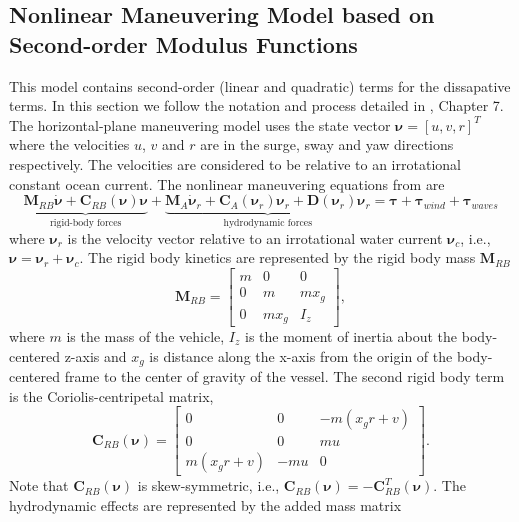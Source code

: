 \documentclass[11pt,draftcls,journal,onecolumn]{IEEEtran}
\begin{document}
\subsection{Nonlinear Maneuvering Model based on Second-order Modulus Functions}
This model contains second-order (linear and quadratic) terms for the dissapative terms. In this section we follow the notation and process detailed in \cite{fossen11handbook}, Chapter 7. The horizontal-plane maneuvering model uses the state vector $\bm{\nu}=[u,v,r]^T$ where the velocities $u$, $v$ and $r$ are in the surge, sway and yaw directions respectively.  The velocities are considered to be relative to an irrotational constant ocean current.  The nonlinear maneuvering equations from \cite{fossen11handbook} are
\begin{equation}
\underbrace{\bm{M}_{RB}\dot{\bm{\nu}}+\bm{C}_{RB}(\bm{\nu})\bm{\nu}}_\text{rigid-body forces} +
\underbrace{\bm{M}_A\dot{\bm{\nu}}_r + \bm{C}_A(\bm{\nu}_r)\bm{\nu}_r + 
\bm{D}(\bm{\nu}_r)\bm{\nu}_r}_\text{hydrodynamic forces}
= \bm{\tau}+\bm{\tau}_{wind}+\bm{\tau}_{waves}
\label{e:fossenmodel}
\end{equation}
where $\bm{\nu}_r$ is the velocity vector relative to an irrotational water current $\bm{\nu}_c$, i.e., $\bm{\nu}=\bm{\nu}_r+\bm{\nu}_c$.  The rigid body kinetics are represented by the rigid body mass $\bm{M}_{RB}$ 
\begin{equation}
\bm{M}_{RB}= \left[ 
\begin{array}{ccc}
m & 0 & 0 \\
0 & m & m x_g \\
0 & m x_g & I_z 
\end{array} \right],
\end{equation}
where $m$ is the mass of the vehicle, $I_z$ is the moment of inertia about the body-centered z-axis and $x_g$ is distance along the x-axis from the origin of the body-centered frame to the center of gravity of the vessel.  The second rigid body term is the Coriolis-centripetal matrix,
\begin{equation}
\bm{C}_{RB}(\bm{\nu})= \left[ 
\begin{array}{ccc}
0 & 0 & -m(x_gr+v) \\
0 & 0 & mu \\
m(x_gr+v) & -mu  & 0 
\end{array} \right].
\end{equation}
Note that $\bm{C}_{RB}(\bm{\nu})$ is skew-symmetric, i.e., $\bm{C}_{RB}(\bm{\nu})=-\bm{C}_{RB}^T(\bm{\nu})$.  The hydrodynamic effects are represented by the added mass matrix
\end{document}
